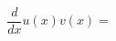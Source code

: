 \documentclass[preview]{standalone}
\begin{document}
\begin{align*}
\dfrac{d}{dx}u(x)v(x) =
\end{align*}
\end{document}
